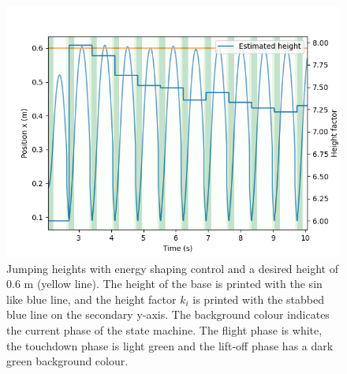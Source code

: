 \documentclass[onecolumn, letter paper]{report}
\begin{document}
\begin{figure}[htb!]
    \centering
    \includegraphics[width=.6\textwidth]{figures/0.6m/height.png}
    \caption{Jumping heights with energy shaping control and a desired height of 0.6 m (yellow line). The height of the base is printed with the sin like blue line, and the height factor $k_i$ is printed with the stabbed blue line on the secondary y-axis. The background colour indicates the current phase of the state machine. The flight phase is white, the touchdown phase is light green and the lift-off phase has a dark green background colour.}
    \label{fig:6height}
\end{figure}
\end{document}
